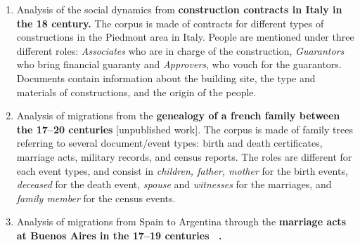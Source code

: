 \newcommand{\pascal}{\#1\xspace}
\newcommand{\nicole}{\#2\xspace}
\newcommand{\zacarias}{\#3\xspace}
\newcommand{\dana}{\#4\xspace}
\newcommand{\myindent}{~~} %
\begin{enumerate}[nosep,leftmargin=*]
    \item Analysis of the social dynamics from \textbf{construction contracts in Italy in the 18 century\cite{cristofoli2018, Rolla2018}.}
    The corpus is made of contracts for different types of constructions in the Piedmont area in Italy. People are mentioned under three different roles: \textit{Associates} who are in charge of the construction, \textit{Guarantors} who bring financial guaranty and \textit{Approvers}, who vouch for the guarantors. Documents contain information about the building site, the type and materials of constructions, and the origin of the people.
    \item Analysis of migrations from the \textbf{genealogy of a french family between the 17--20 centuries} [unpublished work].
    The corpus is made of family trees referring to several document/event types: birth and death certificates, marriage acts, military records, and census reports.
    The roles are different for each event types, and consist in \textit{children, father, mother} for the birth events, \textit{deceased} for the death event, \textit{spouse} and \textit{witnesses} for the marriages, and \textit{family member} for the census events.
    \item Analysis of migrations from Spain to Argentina through the \textbf{marriage acts at Buenos Aires in the 17--19 centuries ~\cite{moutoukias2016buenos, rueda1989matrimonios}.}

\end{enumerate}
